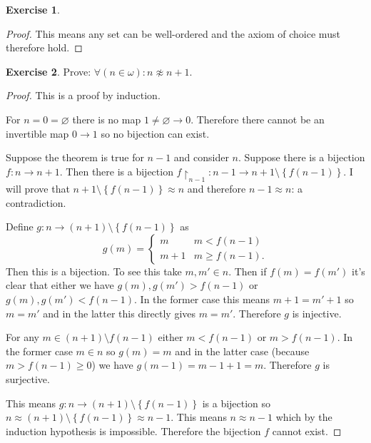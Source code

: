 \documentclass{article}
\theoremstyle{definition}
\newtheorem{question}{Exercise}
\newcommand{\set}[1]{\left\{#1\right\}}
\newcommand{\restrict}{\upharpoonright}
\begin{document}
\begin{question}
\begin{enumerate}[a.]
\begin{proof}
                  This means any set can be well-ordered and the axiom of choice
                  must therefore hold.
              \end{proof}
    \end{enumerate}
\end{question}

\begin{question}
    Prove: \(\forall(n\in\omega):n\not\approx n+1\).

    \begin{proof}
        This is a proof by induction.

        For \(n=0=\varnothing\) there is no map \(1\neq\varnothing\to0\).
        Therefore there cannot be an invertible map \(0\to 1\) so no bijection
        can exist.

        Suppose the theorem is true for \(n-1\) and consider \(n\). Suppose
        there is a bijection \(f:n\to n+1\). Then there is a bijection
        \(f\restrict_{n-1}:n-1\to n+1\setminus\set{f(n-1)}\). I will prove that
        \(n+1\setminus\set{f(n-1)}\approx n\) and therefore \(n-1\approx n\): a
        contradiction.

        Define \(g:n\to (n+1)\setminus\set{f(n-1)}\) as
        \[
            g(m)=\begin{cases}
                m   & m<f(n-1)      \\
                m+1 & m\geq f(n-1).
            \end{cases}
        \]
        Then this is a bijection. To see this take \(m,m'\in n\). Then if
        \(f(m)=f(m')\) it's clear that either we have \(g(m),g(m')>f(n-1)\) or
        \(g(m),g(m')<f(n-1)\). In the former case this means \(m+1=m'+1\) so
        \(m=m'\) and in the latter this directly gives \(m=m'\). Therefore \(g\)
        is injective.

        For any \(m\in (n+1)\setminus f(n-1)\) either \(m<f(n-1)\) or
        \(m>f(n-1)\). In the former case \(m\in n\) so \(g(m)=m\) and in the
        latter case (because \(m>f(n-1)\geq0\)) we have \(g(m-1)=m-1+1=m\).
        Therefore \(g\) is surjective.

        This means \(g:n\to (n+1)\setminus\set{f(n-1)}\) is a bijection so
        \(n\approx(n+1)\setminus\set{f(n-1)}\approx n-1\). This means \(n\approx
        n-1\) which by the induction hypothesis is impossible. Therefore the
        bijection \(f\) cannot exist.
    \end{proof}
\end{question}
\end{document}
